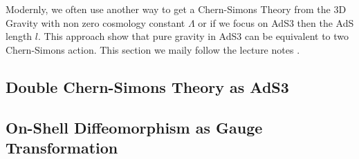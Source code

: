 Modernly, we often use another way to get a Chern-Simons Theory from the 3D Gravity with non zero cosmology constant $ \Lambda $ or if we focus on AdS3 then the AdS length $ l $. This approach show that pure gravity in AdS3 can be equivalent to two Chern-Simons action. This section we maily follow the lecture notes \cite{compereAdvancedLecturesGeneral2019a}.


\subsection{Double Chern-Simons Theory as AdS3}



\subsection{On-Shell Diffeomorphism as Gauge Transformation}
